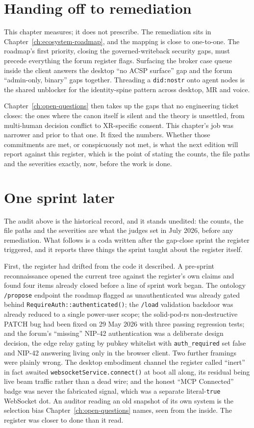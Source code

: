 \section{Handing off to remediation}

This chapter measures; it does not prescribe. The remediation sits in Chapter~\ref{ch:ecosystem-roadmap}, and the mapping is close to one-to-one. The roadmap's first priority, closing the governed-writeback security gaps, must precede everything the forum register flags. Surfacing the broker case queue inside the client answers the desktop ``no ACSP surface'' gap and the forum ``admin-only, binary'' gaps together. Threading a \texttt{did:nostr} onto agent nodes is the shared unblocker for the identity-spine pattern across desktop, MR and voice.

Chapter~\ref{ch:open-questions} then takes up the gaps that no engineering ticket closes: the ones where the canon itself is silent and the theory is unsettled, from multi-human decision conflict to XR-specific consent. This chapter's job was narrower and prior to that one. It fixed the numbers. Whether those commitments are met, or conspicuously not met, is what the next edition will report against this register, which is the point of stating the counts, the file paths and the severities exactly, now, before the work is done.

\section{One sprint later}

The audit above is the historical record, and it stands unedited: the counts, the file paths and the severities are what the judges set in July 2026, before any remediation. What follows is a coda written after the gap-close sprint the register triggered, and it reports three things the sprint taught about the register itself.

First, the register had drifted from the code it described. A pre-sprint reconnaissance opened the current tree against the register's own claims and found four items already closed before a line of sprint work began. The ontology \texttt{/propose} endpoint the roadmap flagged as unauthenticated was already gated behind \texttt{RequireAuth::authenticated()}; the \texttt{/load} validation backdoor was already reduced to a single power-user scope; the solid-pod-rs non-destructive PATCH bug had been fixed on 29 May 2026 with three passing regression tests; and the forum's ``missing'' NIP-42 authentication was a deliberate design decision, the edge relay gating by pubkey whitelist with \texttt{auth\_required} set false and NIP-42 answering living only in the browser client. Two further framings were plainly wrong. The desktop embodiment channel the register called ``inert'' in fact awaited \texttt{websocketService.connect()} at boot all along, its residual being live beam traffic rather than a dead wire; and the honest ``MCP Connected'' badge was never the fabricated signal, which was a separate literal-\texttt{true} WebSocket dot. An auditor reading an old snapshot of its own system is the selection bias Chapter~\ref{ch:open-questions} names, seen from the inside. The register was closer to done than it read.

